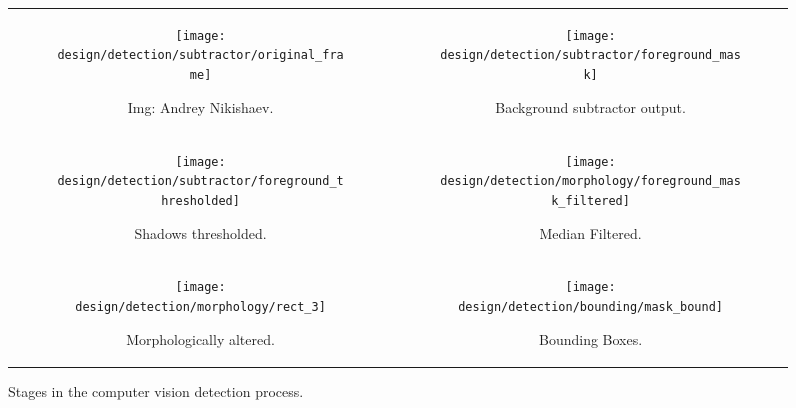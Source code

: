 \begin{figure}[h]
    \centering
    \begin{tabular}{c c}
        \begin{subfigure}[b]{0.4\textwidth}
            \texttt{[image: design/detection/subtractor/original\_frame]}
            \captionsetup{format = hang}
            \caption{Img: Andrey Nikishaev.}
            \label{fig:original_frame}
        \end{subfigure} & 
        \begin{subfigure}[b]{0.4\textwidth}
            \texttt{[image: design/detection/subtractor/foreground\_mask]}
            \captionsetup{format = hang}
            \caption{Background subtractor output.}
            \label{fig:foreground_mask_unfiltered}
        \end{subfigure} \\
        \begin{subfigure}[b]{0.4\textwidth}
            \texttt{[image: design/detection/subtractor/foreground\_thresholded]}
            \captionsetup{format = hang}
            \caption{Shadows thresholded.}
            \label{fig:thresh_shadow}
        \end{subfigure} &
        \begin{subfigure}[b]{0.4\textwidth}
            \texttt{[image: design/detection/morphology/foreground\_mask\_filtered]}
            \captionsetup{format = hang}
            \caption{Median Filtered.}
            \label{fig:mask_saltnpepper}
        \end{subfigure} \\
        \begin{subfigure}[b]{0.4\textwidth}
            \texttt{[image: design/detection/morphology/rect\_3]}
            \captionsetup{format = hang}
            \caption{Morphologically altered.}
            \label{fig:morphed}
        \end{subfigure} &
        \begin{subfigure}[b]{0.4\textwidth}
            \texttt{[image: design/detection/bounding/mask\_bound]}
            \captionsetup{format = hang}
            \caption{Bounding Boxes.}
            \label{fig:bounding_boxes}
        \end{subfigure}
    \end{tabular}
    \captionsetup{format=hang}
    \caption{Stages in the computer vision detection process.}
    \label{fig:example_subtraction}
\end{figure}






